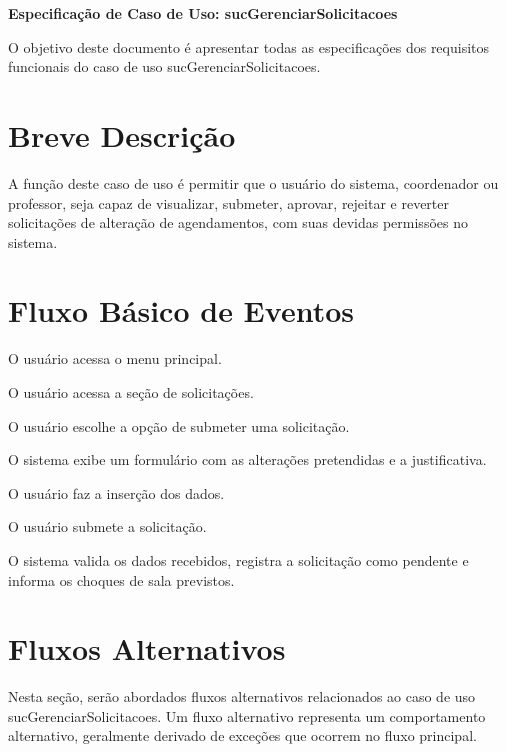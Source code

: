 \documentclass[12pt,a4paper]{article}
\newcommand{\ucnome}{sucGerenciarSolicitacoes}
\newcommand{\uctitulo}{Especificação de Caso de Uso: \ucnome}
\begin{document}

\begin{center}
  {\Large\bfseries \uctitulo}
\end{center}

\vspace{0.5\baselineskip}

O objetivo deste documento é apresentar todas as especificações dos requisitos
funcionais do caso de uso \ucnome.

\section{Breve Descrição}

A função deste caso de uso é permitir que o usuário do sistema, coordenador ou
professor, seja capaz de visualizar, submeter, aprovar, rejeitar e reverter
solicitações de alteração de agendamentos, com suas devidas permissões no
sistema.

\section{Fluxo Básico de Eventos}

\begin{fluxo}
  \item O usuário acessa o menu principal.
  \item O usuário acessa a seção de solicitações.
  \item O usuário escolhe a opção de submeter uma solicitação.
  \item O sistema exibe um formulário com as alterações pretendidas e a
        justificativa.
  \item O usuário faz a inserção dos dados.
  \item O usuário submete a solicitação.
  \item O sistema valida os dados recebidos, registra a solicitação como
        pendente e informa os choques de sala previstos.
\end{fluxo}

\section{Fluxos Alternativos}

Nesta seção, serão abordados fluxos alternativos relacionados ao caso de uso
\ucnome. Um fluxo alternativo representa um comportamento alternativo,
geralmente derivado de exceções que ocorrem no fluxo principal.
\end{document}
